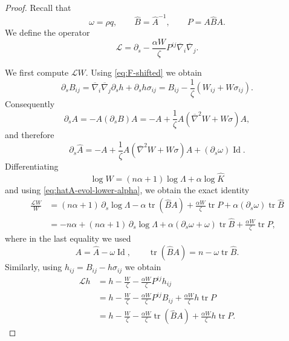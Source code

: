 \documentclass[10pt,a4paper]{amsart}
\newcommand{\Id}{\operatorname{Id}}
\DeclareMathOperator{\tr}{tr}
\begin{document}
\begin{proof}
Recall that
\begin{equation*}
    \omega=\rho q,
    \qquad
    \widehat B=\widehat A^{-1},
    \qquad
    P=A\widehat B A.
\end{equation*}
We define the operator
\begin{equation*}
        \mathcal L
        =\partial_s-\frac{\alpha W}{\zeta}P^{ij}\overline{\nabla}_i\overline{\nabla}_j.
\end{equation*}

We first compute $\mathcal{L}W$. Using \eqref{eq:F-shifted} we obtain
\begin{equation*}
        \partial_sB_{ij}
        =\overline{\nabla}_i\overline{\nabla}_j \partial_sh+\partial_sh\sigma_{ij}
        =B_{ij}-\frac{1}{\zeta}(W_{ij}+W\sigma_{ij}).
\end{equation*}
Consequently
\begin{equation*}
        \partial_sA=-A(\partial_sB)A
        =-A+\frac{1}{\zeta} A(\overline{\nabla}^2 W+ W\sigma)A,
\end{equation*}
and therefore
\begin{equation}\label{eq:hatA-evol-lower-alpha}
        \partial_s\widehat A
        =-A+\frac{1}{\zeta} A(\overline{\nabla}^2 W+ W\sigma)A+(\partial_s\omega)\Id .
\end{equation}
Differentiating
\begin{equation*}
        \log W=(n\alpha+1)\log \Lambda+\alpha\log\widehat K
\end{equation*}
and using \eqref{eq:hatA-evol-lower-alpha}, we obtain the exact identity
\begin{align}
        \frac{\mathcal L W}{W}
        &=
        (n\alpha+1)\,\partial_s\log \Lambda
        -\alpha\tr(\widehat B A)
        +\frac{\alpha W}{\zeta}\tr P
        +\alpha(\partial_s\omega)\tr\widehat B   \nonumber \\
        &=
        -n\alpha
        +(n\alpha+1)\,\partial_s\log \Lambda
        +\alpha(\partial_s\omega+\omega)\tr\widehat B
        +\frac{\alpha W}{\zeta}\tr P,   \label{eq:LF-rough}
\end{align}
where in the last equality we used
\begin{equation*}
        A=\widehat A-\omega\Id,\qquad
        \tr(\widehat B A)=n-\omega\tr\widehat B .
\end{equation*}
Similarly, using $h_{ij}=B_{ij}-h\sigma_{ij}$ we obtain
\begin{align}
        \mathcal{L} h
        &=h-\frac{W}{\zeta}
          -\frac{\alpha W}{\zeta}P^{ij}h_{ij} \nonumber  \\
        &=h-\frac{W}{\zeta}
          -\frac{\alpha W}{\zeta}P^{ij}B_{ij}
          +\frac{\alpha W}{\zeta}h\tr P     \nonumber     \\
        &=h-\frac{W}{\zeta}
          -\frac{\alpha W}{\zeta}\tr(\widehat B A)
          +\frac{\alpha W}{\zeta}h\tr P.  \label{eq:Lh-exact-lower-alpha}
\end{align}


\end{proof}
\end{document}
